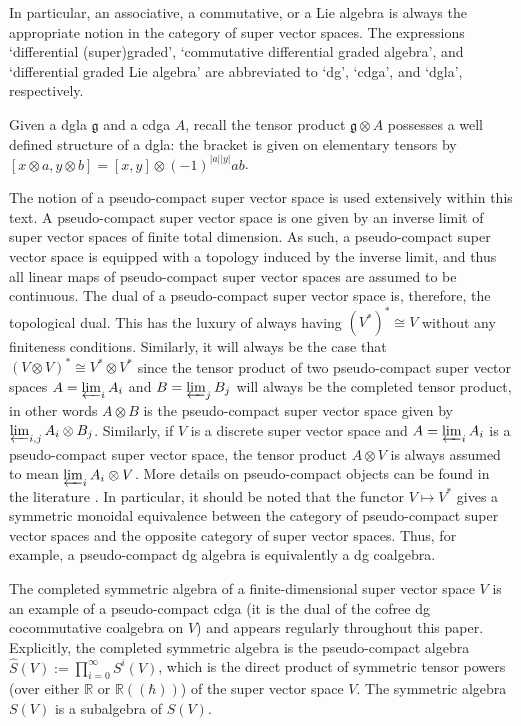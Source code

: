 \documentclass[]{amsart}
\theoremstyle{definition}
\begin{document}
In particular, an associative, a commutative, or a Lie algebra is always the appropriate notion in the category of super vector spaces. The expressions `differential (super)graded', `commutative differential graded algebra', and `differential graded Lie algebra' are abbreviated to `dg', `cdga', and `dgla', respectively.

Given a dgla $\mathfrak{g}$ and a cdga $A$, recall the tensor product $\mathfrak{g}\otimes A$ possesses a well defined structure of a dgla: the bracket is given on elementary tensors by $[x\otimes a,y\otimes b]=[x,y]\otimes (-1)^{|a||y|} ab$.

The notion of a pseudo-compact super vector space is used extensively within this text. A pseudo-compact super vector space is one given by an inverse limit of super vector spaces of finite total dimension. As such, a pseudo-compact super vector space is equipped with a topology induced by the inverse limit, and thus all linear maps of pseudo-compact super vector spaces are assumed to be continuous. The dual of a pseudo-compact super vector space is, therefore, the topological dual. This has the luxury of always having $(V^*)^*\cong V$ without any finiteness conditions. Similarly, it will always be the case that $(V \otimes V)^*\cong V^* \otimes V^*$ since the tensor product of two pseudo-compact super vector spaces $A = \varprojlim_i A_i$ and $B = \varprojlim_j B_j$ will always be the completed tensor product, in other words $A \otimes B$ is the pseudo-compact super vector space given by $\varprojlim_{i,j} A_i \otimes B_j$. Similarly, if $V$ is a discrete super vector space and $A = \varprojlim_i A_i$ is a pseudo-compact super vector space, the tensor product $A\otimes V$ is always assumed to mean $\varprojlim_i A_i \otimes V$. More details on pseudo-compact objects can be found in the literature \cite{gabriel,keller_yang,vandenbergh}. In particular, it should be noted that the functor $V\mapsto V^*$ gives a symmetric monoidal equivalence between the category of pseudo-compact super vector spaces and the opposite category of super vector spaces. Thus, for example, a pseudo-compact dg algebra is equivalently a dg coalgebra.

The completed symmetric algebra of a finite-dimensional super vector space $V$ is an example of a pseudo-compact cdga (it is the dual of the cofree dg cocommutative coalgebra on $V$) and appears regularly throughout this paper. Explicitly, the completed symmetric algebra is the pseudo-compact algebra $\hat{S}(V):=\prod_{i=0}^\infty S^i(V)$, which is the direct product of symmetric tensor powers (over either $\mathbb{R}$ or $\mathbb{R}((\hbar ))$) of the super vector space $V$. The symmetric algebra $S(V)$ is a subalgebra of $\hat{S}(V)$.
\end{document}
